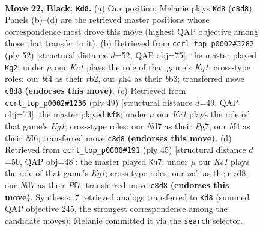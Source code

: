 \documentclass[11pt]{article}
\begin{document}
\clearpage

\begin{figure}[p]\centering
\begin{subfigure}{0.46\textwidth}\centering
\resizebox{\linewidth}{!}{%
\newchessgame
\chessboard[
  setfen={2k3r1/Nppnp2p/6p1/p7/1n3B1P/5P2/P1P1KP2/R7 b - - 2 22},
  showmover=false,
  pgfstyle=straightmove, color=movearrow, markmove={c8-d8}
]}
\caption{}
\end{subfigure}\hfill
\begin{subfigure}{0.46\textwidth}\centering
\resizebox{\linewidth}{!}{%
\newchessgame
\chessboard[
  setfen={B5k1/p4ppp/4p3/R1N1P3/8/1b4P1/1r2nP1P/2R3K1 w - - 0 27},
  showmover=false,
  pgfstyle=straightmove, color=movearrow, markmove={g1-g2}
]}
\caption{}
\end{subfigure}
\\[4pt]
\begin{subfigure}{0.46\textwidth}\centering
\resizebox{\linewidth}{!}{%
\newchessgame
\chessboard[
  setfen={r5k1/p3Npp1/5n1p/2p5/5B2/2P1P2P/P4Pb1/2R3K1 b - - 1 25},
  showmover=false,
  pgfstyle=straightmove, color=movearrow, markmove={g8-f8}
]}
\caption{}
\end{subfigure}\hfill
\begin{subfigure}{0.46\textwidth}\centering
\resizebox{\linewidth}{!}{%
\newchessgame
\chessboard[
  setfen={3R2k1/1p3pp1/4pn1p/p1r5/P7/1BP2P1P/1P3P2/6K1 b - - 1 23},
  showmover=false,
  pgfstyle=straightmove, color=movearrow, markmove={g8-h7}
]}
\caption{}
\end{subfigure}
\caption{\textbf{Move 22, Black: \texttt{Kd8}.} (a) Our position; Melanie plays \texttt{Kd8} (\texttt{c8d8}). Panels (b)--(d) are the retrieved master positions whose correspondence most drove this move (highest QAP objective among those that transfer to it). (b) Retrieved from \texttt{ccrl\_top\_p0002\#3282} (ply 52) [structural distance $d$=52, QAP obj=75]: the master played \texttt{Kg2}; under $\mu$ our \emph{Kc1} plays the role of that game's \emph{Kg1}; cross-type roles: our \emph{b}f4 as their \emph{r}b2, our \emph{p}h4 as their \emph{b}b3; transferred move \texttt{c8d8} \textbf{(endorses this move)}. (c) Retrieved from \texttt{ccrl\_top\_p0002\#1236} (ply 49) [structural distance $d$=49, QAP obj=73]: the master played \texttt{Kf8}; under $\mu$ our \emph{Kc1} plays the role of that game's \emph{Kg1}; cross-type roles: our \emph{N}d7 as their \emph{P}g7, our \emph{b}f4 as their \emph{N}f6; transferred move \texttt{c8d8} \textbf{(endorses this move)}. (d) Retrieved from \texttt{ccrl\_top\_p0000\#191} (ply 45) [structural distance $d$=50, QAP obj=48]: the master played \texttt{Kh7}; under $\mu$ our \emph{Kc1} plays the role of that game's \emph{Kg1}; cross-type roles: our \emph{n}a7 as their \emph{r}d8, our \emph{N}d7 as their \emph{P}f7; transferred move \texttt{c8d8} \textbf{(endorses this move)}. Synthesis: 7 retrieved analogs transferred to \texttt{Kd8} (summed QAP objective 245, the strongest correspondence among the candidate moves); Melanie committed it via the \texttt{search} selector.}
\label{fig:thought-m43}
\end{figure}
\end{document}
